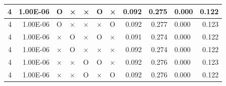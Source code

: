 \documentclass[11pt]{article}
\begin{document}
\begin{longtable}[h]{|r|r|l|l|l|l|l|r|r|l|r|}
4                                 & 1.00E-06                         & O                                & ×                                & ×                                & O                                & ×                                 & 0.092                             & 0.275                             & 0.000                              & 0.122                               \\ \hline
4                                 & 1.00E-06                         & O                                & ×                                & ×                                & ×                                & O                                 & 0.092                             & 0.277                             & 0.000                              & 0.123                               \\ \hline
4                                 & 1.00E-06                         & ×                                & O                                & ×                                & O                                & ×                                 & 0.091                             & 0.274                             & 0.000                              & 0.122                               \\ \hline
4                                 & 1.00E-06                         & ×                                & O                                & ×                                & ×                                & ×                                 & 0.092                             & 0.274                             & 0.000                              & 0.122                               \\ \hline
4                                 & 1.00E-06                         & ×                                & ×                                & O                                & O                                & ×                                 & 0.092                             & 0.276                             & 0.000                              & 0.123                               \\ \hline
4                                 & 1.00E-06                         & ×                                & ×                                & O                                & ×                                & O                                 & 0.092                             & 0.276                             & 0.000                              & 0.122                               \\ \hline

\end{longtable}
\end{document}
